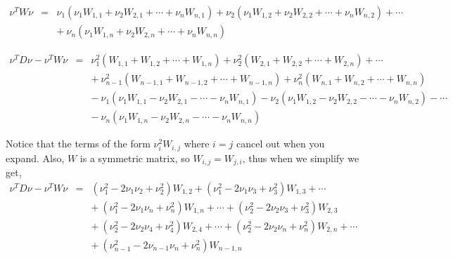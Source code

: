 \documentclass[a4paper]{article}
\begin{document}
\begin{eqnarray}
  \nu^{T}W \nu & = & \nu_{1}\left(\nu_{1}W_{1,1} + \nu_{2}W_{2,1} +
    \cdots + \nu_{n}W_{n,1}\right) + \nu_{2}\left(\nu_{1}W_{1,2} +
    \nu_{2}W_{2,2} + \cdots + \nu_{n}W_{n,2}\right) + \cdots \nonumber
  \\ 
  && +\> \nu_{n}\left(\nu_{1}W_{1,n} + \nu_{2}W_{2,n} + \cdots +
    \nu_{n}W_{n,n}\right) \nonumber  
\end{eqnarray}

\begin{eqnarray}
  \nu^{T}D \nu-\nu^{T}W \nu & = & \nu_{1}^{2}\left(W_{1,1} +
    W_{1,2} + \cdots + W_{1,n}\right) + \nu_{2}^{2}\left(W_{2,1} +
    W_{2,2} + \cdots + W_{2,n}\right) + \cdots \nonumber \\ 
  && +\> \nu_{n-1}^{2}\left(W_{n-1,1} + W_{n-1,2} + \cdots +
    W_{n-1,n}\right) + \nu_{n}^{2}\left(W_{n,1} + W_{n,2} + \cdots +
    W_{n,n}\right) \nonumber\\ 
  && -\> \nu_{1}\left(\nu_{1}W_{1,1} - \nu_{2}W_{2,1} - \cdots -
    \nu_{n}W_{n,1}\right) - \nu_{2}\left(\nu_{1}W_{1,2} - \nu_{2}W_{2,2}
    - \cdots - \nu_{n}W_{n,2}\right) - \cdots \nonumber \\ 
  && -\> \nu_{n}\left(\nu_{1}W_{1,n} - \nu_{2}W_{2,n} - \cdots -
    \nu_{n}W_{n,n}\right) \nonumber 
\end{eqnarray}

Notice that the terms of the form $\nu_{i}^{2}W_{i,j}$ where $i=j$
cancel out when you expand. Also, $W$ is a symmetric matrix, so
$W_{i,j} = W_{j,i}$, thus when we simplify we get,\\ 
\begin{eqnarray}
  \nu^{T}D \nu-\nu^{T}W \nu & = & \left(\nu_{1}^{2} -
    2\nu_{1}\nu_{2} + \nu_{2}^{2}\right)W_{1,2} + \left(\nu_{1}^{2} -
    2\nu_{1}\nu_{3} + \nu_{3}^{2}\right)W_{1,3} + \cdots \nonumber \\ 
  && +\> \left(\nu_{1}^{2} - 2\nu_{1}\nu_{n} + \nu_{n}^{2}\right)W_{1,n}
  + \cdots + \left(\nu_{2}^{2} - 2\nu_{2}\nu_{3} +
    \nu_{3}^{2}\right)W_{2,3} \nonumber\\ 
  && +\> \left(\nu_{2}^{2} - 2\nu_{2}\nu_{4} + \nu_{4}^{2}\right)W_{2,4}
  + \cdots + \left(\nu_{2}^{2} - 2\nu_{2}\nu_{n} +
    \nu_{n}^{2}\right)W_{2,n} + \cdots \nonumber\\ 
  && +\> \left(\nu_{n-1}^{2} - 2\nu_{n-1}\nu_{n} +
    \nu_{n}^{2}\right)W_{n-1,n} \nonumber 
\end{eqnarray}\\
\end{document}
